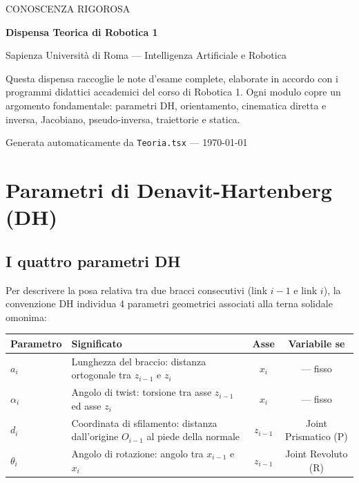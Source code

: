 \documentclass[11pt, a4paper]{article}
\begin{document}
\begin{titlepage}
  \centering
  \vspace*{3cm}
  {\small\ttfamily\color{cyan800} CONOSCENZA RIGOROSA}\par
  \vspace{0.8cm}
  {\Huge\bfseries Dispensa Teorica di Robotica 1}\par
  \vspace{0.4cm}
  {\large Sapienza Università di Roma --- Intelligenza Artificiale e Robotica}\par
  \vspace{1.2cm}
  {\normalsize
    Questa dispensa raccoglie le note d'esame complete, elaborate in accordo con i
    programmi didattici accademici del corso di Robotica 1.
    Ogni modulo copre un argomento fondamentale: parametri DH, orientamento, cinematica
    diretta e inversa, Jacobiano, pseudo-inversa, traiettorie e statica.
  }\par
  \vfill
  {\small Generata automaticamente da \texttt{Teoria.tsx} --- \today}
\end{titlepage}

\tableofcontents
\newpage

\section{Parametri di Denavit-Hartenberg (DH)}

\subsection{I quattro parametri DH}

Per descrivere la posa relativa tra due bracci consecutivi (link $i{-}1$ e link $i$),
la convenzione DH individua 4 parametri geometrici associati alla terna solidale omonima:

\vspace{4pt}
\begin{center}
\renewcommand{\arraystretch}{1.4}
\begin{tabular}{lp{6.5cm}cc}
\toprule
\textbf{Parametro} & \textbf{Significato} & \textbf{Asse} & \textbf{Variabile se}\\
\midrule
$a_i$       & Lunghezza del braccio: distanza ortogonale tra $z_{i-1}$ e $z_i$              & $x_i$     & — fisso\\
$\alpha_i$  & Angolo di twist: torsione tra asse $z_{i-1}$ ed asse $z_i$                    & $x_i$     & — fisso\\
$d_i$       & Coordinata di sfilamento: distanza dall'origine $O_{i-1}$ al piede della normale & $z_{i-1}$ & Joint Prismatico (P)\\
$\theta_i$  & Angolo di rotazione: angolo tra $x_{i-1}$ e $x_i$                             & $z_{i-1}$ & Joint Revoluto (R)\\
\bottomrule
\end{tabular}
\end{center}
\end{document}
